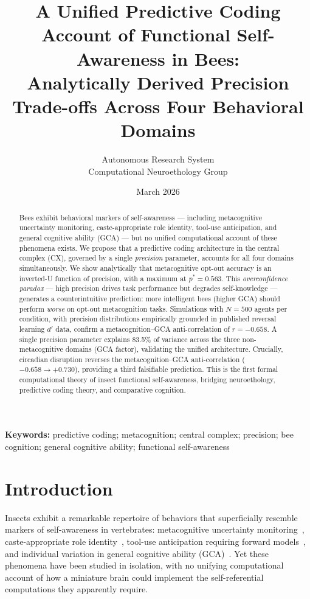 \documentclass[12pt]{article}
\title{A Unified Predictive Coding Account of Functional Self-Awareness in Bees:\\
Analytically Derived Precision Trade-offs Across Four Behavioral Domains}
\author{
  Autonomous Research System\\
  \small Computational Neuroethology Group
}
\date{March 2026}
\newcommand{\pstar}{p^*}
\begin{document}
\maketitle

\begin{abstract}
Bees exhibit behavioral markers of self-awareness --- including metacognitive uncertainty
monitoring, caste-appropriate role identity, tool-use anticipation, and general cognitive
ability (GCA) --- but no unified computational account of these phenomena exists. We propose
that a predictive coding architecture in the central complex (CX), governed by a single
\emph{precision} parameter, accounts for all four domains simultaneously. We show
analytically that metacognitive opt-out accuracy is an inverted-U function of precision,
with a maximum at $\pstar = 0.563$. This \emph{overconfidence paradox} --- high precision
drives task performance but degrades self-knowledge --- generates a counterintuitive
prediction: more intelligent bees (higher GCA) should perform \emph{worse} on opt-out
metacognition tasks. Simulations with $N = 500$ agents per condition, with precision
distributions empirically grounded in published reversal learning $d'$ data, confirm a
metacognition--GCA anti-correlation of $r = -0.658$. A single precision parameter explains
83.5\% of variance across the three non-metacognitive domains (GCA factor), validating the
unified architecture. Crucially, circadian disruption reverses the metacognition--GCA
anti-correlation ($-0.658 \to +0.730$), providing a third falsifiable prediction. This is
the first formal computational theory of insect functional self-awareness, bridging
neuroethology, predictive coding theory, and comparative cognition.
\end{abstract}

\vspace{1em}
\noindent\textbf{Keywords:} predictive coding; metacognition; central complex; precision;
bee cognition; general cognitive ability; functional self-awareness

\section{Introduction}
\label{sec:intro}

Insects exhibit a remarkable repertoire of behaviors that superficially resemble markers of
self-awareness in vertebrates: metacognitive uncertainty monitoring~\cite{Giurfa2013},
caste-appropriate role identity~\cite{SciAdv2024Caste}, tool-use anticipation requiring forward
models~\cite{NaturePuzzle2024}, and individual variation in general cognitive ability
(GCA)~\cite{AnimalCog2024}. Yet these phenomena have been studied in isolation, with no unifying
computational account of how a miniature brain could implement the self-referential computations
they apparently require.
\end{document}
